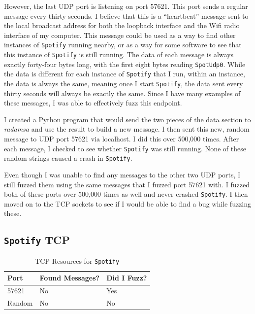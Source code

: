 However, the last UDP port is listening on port 57621.  This port sends a regular message every thirty seconds.  I believe that this is a ``heartbeat'' message sent to the local broadcast address for both the loopback interface and the Wifi radio interface of my computer.  This message could be used as a way to find other instances of \texttt{Spotify} running nearby, or as a way for some software to see that this instance of \texttt{Spotify} is still running.  The data of each message is always exactly forty-four bytes long, with the first eight bytes reading \texttt{SpotUdp0}.  While the data is different for each instance of \texttt{Spotify} that I run, within an instance, the data is always the same, meaning once I start \texttt{Spotify}, the data sent every thirty seconds will always be exactly the same.  Since I have many examples of these messages, I was able to effectively fuzz this endpoint.

I created a Python program that would send the two pieces of the data section to \textit{radamsa} and use the result to build a new message.  I then sent this new, random message to UDP port 57621 via localhost.  I did this over 500,000 times.  After each message, I checked to see whether \texttt{Spotify} was still running.  None of these random strings caused a crash in \texttt{Spotify}.

Even though I was unable to find any messages to the other two UDP ports, I still fuzzed them using the same messages that I fuzzed port 57621 with.  I fuzzed both of these ports over 500,000 times as well and never crashed \texttt{Spotify}.  I then moved on to the TCP sockets to see if I would be able to find a bug while fuzzing these.

\subsection{\texttt{Spotify} TCP}
\label{sec:spotifyTcp}

\begin{table}
\centering
\begin{normalsize}
\begin{tabular}{ l | l | l }
\textbf{Port} & \textbf{Found Messages?} & \textbf{Did I Fuzz?} \\ \hline
57621 & No & Yes \\ \hline
Random & No & No \\ \hline
\end{tabular}
\caption{TCP Resources for \texttt{Spotify}}
\label{tab:SpotifyTcp}
\end{normalsize}
\end{table}

